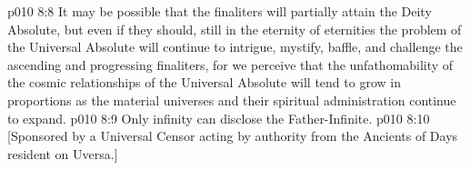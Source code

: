 \vs p010 8:8 It may be possible that the finaliters will partially attain the Deity Absolute, but even if they should, still in the eternity of eternities the problem of the Universal Absolute will continue to intrigue, mystify, baffle, and challenge the ascending and progressing finaliters, for we perceive that the unfathomability of the cosmic relationships of the Universal Absolute will tend to grow in proportions as the material universes and their spiritual administration continue to expand.
\vs p010 8:9 \pc Only infinity can disclose the Father\hyp{}Infinite.
\vsetoff
\vs p010 8:10 [Sponsored by a Universal Censor acting by authority from the Ancients of Days resident on Uversa.]
\quizlink
